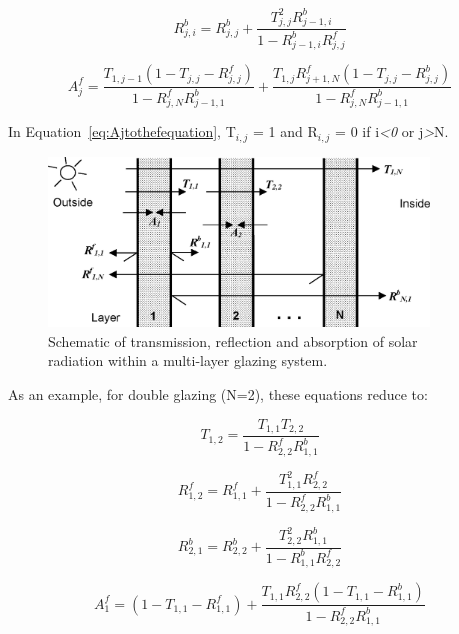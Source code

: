 \begin{equation}
R_{j,i}^b = R_{j,j}^b + \frac{{T_{j,j}^2R_{j - 1,i}^b}}{{1 - R_{j - 1,i}^bR_{j,j}^f}}
\end{equation}

\begin{equation}
A_j^f = \frac{{{T_{1,j - 1}}(1 - {T_{j,j}} - R_{j,j}^f)}}{{1 - R_{j,N}^fR_{j - 1,1}^b}} + \frac{{{T_{1,j}}R_{j + 1,N}^f(1 - {T_{j,j}} - R_{j,j}^b)}}{{1 - R_{j,N}^fR_{j - 1,1}^b}}
\label{eq:Ajtothefequation}
\end{equation}

In Equation~\ref{eq:Ajtothefequation}, {T\(_{i,j}\)} = 1 and {R\(_{i,j}\)} = 0 if i\emph{\textless{}0} or j\emph{\textgreater{}}N.

\begin{figure}[hbtp] %
\centering
\includegraphics[width=0.9\textwidth, height=0.9\textheight, keepaspectratio=true]{media/image956.png}
\caption{Schematic of transmission, reflection and absorption of solar radiation within a multi-layer glazing system. \protect \label{fig:schematic-of-transmission-reflection}}
\end{figure}

As an example, for double glazing (N=2), these equations reduce to:

\begin{equation}
{T_{1,2}} = \frac{{{T_{1,1}}{T_{2,2}}}}{{1 - R_{2,2}^fR_{1,1}^b}}
\end{equation}

\begin{equation}
R_{1,2}^f = R_{1,1}^f + \frac{{T_{1,1}^2R_{2,2}^f}}{{1 - R_{2,2}^fR_{1,1}^b}}
\end{equation}

\begin{equation}
R_{2,1}^b = R_{2,2}^b + \frac{{T_{2,2}^2R_{1,1}^b}}{{1 - R_{1,1}^bR_{2,2}^f}}
\end{equation}

\begin{equation}
A_1^f = (1 - {T_{1,1}} - R_{1,1}^f) + \frac{{{T_{1,1}}R_{2,2}^f(1 - {T_{1,1}} - R_{1,1}^b)}}{{1 - R_{2,2}^fR_{1,1}^b}}
\end{equation}

